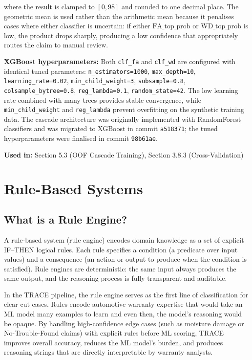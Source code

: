 \documentclass[10pt]{article}
\begin{document}
where the result is clamped to $[0, 98]$ and rounded to one decimal place. The geometric mean is used rather than the arithmetic mean because it penalises cases where either classifier is uncertain: if either $\text{FA\_top\_prob}$ or $\text{WD\_top\_prob}$ is low, the product drops sharply, producing a low confidence that appropriately routes the claim to manual review.

\textbf{XGBoost hyperparameters:} Both \texttt{clf\_fa} and \texttt{clf\_wd} are configured with identical tuned parameters: \texttt{n\_estimators=1000}, \texttt{max\_depth=10}, \texttt{learning\_rate=0.02}, \texttt{min\_child\_weight=3}, \texttt{subsample=0.8}, \texttt{colsample\_bytree=0.8}, \texttt{reg\_lambda=0.1}, \texttt{random\_state=42}. The low learning rate combined with many trees provides stable convergence, while \texttt{min\_child\_weight} and \texttt{reg\_lambda} prevent overfitting on the synthetic training data. The cascade architecture was originally implemented with RandomForest classifiers and was migrated to XGBoost in commit \texttt{a518371}; the tuned hyperparameters were finalised in commit \texttt{98b61ae}.

\textbf{Used in:} Section 5.3 (OOF Cascade Training), Section 3.8.3 (Cross-Validation)

\section{Rule-Based Systems}

\subsection{What is a Rule Engine?}

A rule-based system (rule engine) encodes domain knowledge as a set of explicit IF--THEN logical rules. Each rule specifies a condition (a predicate over input values) and a consequence (an action or output to produce when the condition is satisfied). Rule engines are deterministic: the same input always produces the same output, and the reasoning process is fully transparent and auditable.

In the TRACE pipeline, the rule engine serves as the first line of classification for clear-cut cases. Rules encode automotive warranty expertise that would take an ML model many examples to learn and even then, the model's reasoning would be opaque. By handling high-confidence edge cases (such as moisture damage or No-Trouble-Found claims) with explicit rules before ML scoring, TRACE improves overall accuracy, reduces the ML model's burden, and produces reasoning strings that are directly interpretable by warranty analysts.
\end{document}
